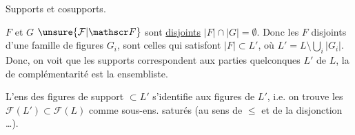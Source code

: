 Supports et cosupports.

$F$ et $G$  $\unsure{\mathcal F|\mathscr F}$ sont \uline{disjoints}   $\lvert F\rvert\cap\lvert G\rvert=\emptyset$. Donc les $F$ disjoints d'une famille de figures $G_i$, sont celles qui  satisfont $\lvert F\rvert\subset L'$, où $L'=L\setminus\bigcup_i\lvert G_i\rvert$. Donc, on voit que les supports correspondent aux parties quelconques $L'$ de $L$, la  de complémentarité est la  ensembliste.

 L'ens des figures  de support $\subset L'$  s'identifie aux figures de $L'$, i.e. on trouve les $\mathcal F(L')\subset\mathcal F(L)$ comme sous-ens. saturés (au sens de $\leq$ et de la disjonction \ldots).

